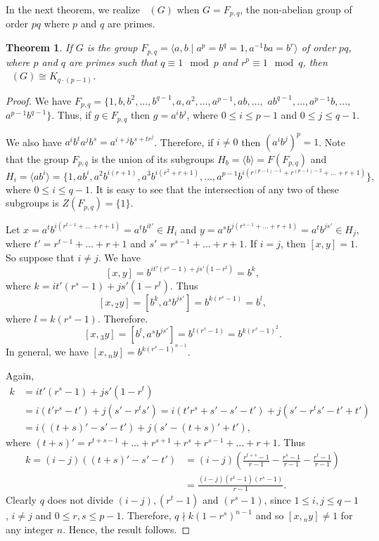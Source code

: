 \documentclass[reqno,12pt]{amsart}
\theoremstyle{plain}
\newtheorem{thm}{Theorem}[section]
\theoremstyle{definition}
\newcommand{\coeng}{\mathop{\mathcal{E}_c^-}}
\begin{document}
In the next theorem, we realize $\coeng(G)$ when $G = F_{p, q}$, the non-abelian group of order $pq$ where $p$ and $q$ are primes.
\begin{thm} \label{pq} 
If $G$ is the group $F_{p, q} = \langle a,b \mid a^p=b^q=1, a^{-1}ba=b^r\rangle$ of order $pq$, where $p$ and $q$ are primes such that $q\equiv 1 \mod p$ and $r^p\equiv 1 \mod q$, then $\coeng(G)\cong K_{q \cdot (p-1)}$. 
\end{thm}

\begin{proof}
We have \quad $F_{p, q} =\{1,b,b^2,\dots,b^{q-1},a,a^2,\dots,a^{p-1},ab,\dots,$ $ab^{q-1},\dots,a^{p-1}b,\dots,$ $a^{p-1}b^{q-1}\}$. Thus, if  $g \in F_{p, q}$ then  $g = a^ib^j$, where $0\leq i\leq p-1$ and $0\leq j\leq q-1$.

We also have $a^ib^ta^jb^s=a^{i+j}b^{s+tr^j}$. Therefore, if $i\neq 0$ then $(a^ib^j)^p=1$. Note that the group $F_{p, q}$ is the union of its subgroups $H_b=\langle b\rangle = F(F_{p, q})$ and 
$$
H_i=\langle ab^i\rangle =\{1,ab^i,a^2b^{i(r+1)},a^3b^{i(r^2+r+1)}, \dots,a^{p-1}b^{i(r^{(p-1)-1}+r^{(p-1)-2}+\dots+r+1)}\},
$$
where $0 \leq i \leq q-1$. It is easy to see that the intersection of any two of these subgroups is $Z(F_{p, q}) = \{1\}$.

Let $x=a^tb^{i(r^{t-1}+\dots+r+1)}=a^tb^{it'}\in H_i$ and $y=a^sb^{j(r^{s-1}+\dots+r+1)}=a^tb^{js'}\in H_j$, where $t'=r^{t-1}+\dots+r+1$ and $s'=r^{s-1}+\dots+r+1$. If $i=j$, then $[x,y]=1$. So suppose that $i\neq j$. We have 
$$
[x,y]=b^{it'(r^s-1)+js'(1-r^t)}=b^k,
$$
where $k={it'(r^s-1)+js'(1-r^t)}$. Thus
$$
[x, {}_2y]=[b^k,a^sb^{js'}]=b^{k(r^s-1)}=b^l,
$$
where $l=k(r^s-1)$. Therefore. $$
[x, {}_3y]=[b^l,a^sb^{js'}]=b^{l(r^s-1)}=b^{k(r^s-1)^2}.
$$
In general, we have $[x, {}_ny]=b^{k(r^s-1)^{n-1}}$.

Again, 
\begin{align*}
k &=it'(r^s-1)+js'(1-r^t)\\
&=i(t'r^s-t')+j(s'-r^ts')=i(t'r^s+s'-s'-t')+j(s'-r^ts'-t'+t')\\
&=i((t+s)'-s'-t')+j(s'- (t+s)' + t'),
\end{align*} 
where \quad $(t+s)' = r^{t+s-1}+\dots+r^{s+1}+r^s+r^{s-1}+\dots+r+1$. Thus 
\begin{align*}
k=(i-j)((t+s)'-s'-t') &=(i-j)\left(\frac{r^{t+s}-1}{r-1}-\frac{r^{s}-1}{r-1}-\frac{r^{t}-1}{r-1}\right)\\
& = \frac{(i-j)(r^{t}-1)(r^{s}-1)}{r-1}.
\end{align*}
Clearly $q$ does not divide $(i-j), (r^{t}-1)$ and $(r^{s}-1)$, since $1\leq i, j \leq q-1$, $i\neq j$ and $0\leq r, s \leq p-1$.
Therefore, $q \nmid k(1-r^s)^{n-1}$ and so $[x, {}_n y]\neq 1$ for any integer $n$. Hence, the result follows.
\end{proof}
\end{document}
